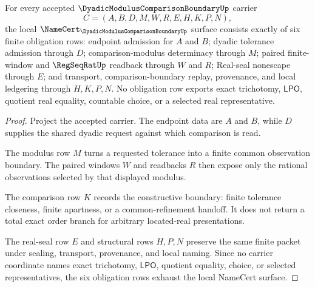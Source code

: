 \begin{theorem}
\label{thm:dyadic-modulus-comparison-boundary-namecert-obligations}
For every accepted $\DyadicModulusComparisonBoundaryUp$ carrier
$$
C=(A,B,D,M,W,R,E,H,K,P,N),
$$
the local $\NameCert_{\DyadicModulusComparisonBoundaryUp}$ surface consists exactly of six finite obligation rows: endpoint admission for $A$ and $B$; dyadic tolerance admission through $D$; comparison-modulus determinacy through $M$; paired finite-window and $\RegSeqRatUp$ readback through $W$ and $R$; Real-seal nonescape through $E$; and transport, comparison-boundary replay, provenance, and local ledgering through $H,K,P,N$. No obligation row exports exact trichotomy, $\mathsf{LPO}$, quotient real equality, countable choice, or a selected real representative.
\end{theorem}
\begin{proof}
Project the accepted carrier. The endpoint data are $A$ and $B$, while $D$ supplies the shared dyadic request against which comparison is read.

The modulus row $M$ turns a requested tolerance into a finite common observation boundary. The paired windows $W$ and readbacks $R$ then expose only the rational observations selected by that displayed modulus.

The comparison row $K$ records the constructive boundary: finite tolerance closeness, finite apartness, or a common-refinement handoff. It does not return a total exact order branch for arbitrary located-real presentations.

The real-seal row $E$ and structural rows $H,P,N$ preserve the same finite packet under sealing, transport, provenance, and local naming. Since no carrier coordinate names exact trichotomy, $\mathsf{LPO}$, quotient equality, choice, or selected representatives, the six obligation rows exhaust the local NameCert surface.
\end{proof}

